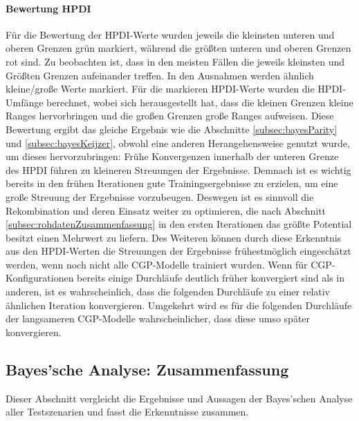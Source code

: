\paragraph{Bewertung HPDI}
Für die Bewertung der HPDI-Werte wurden jeweils die kleinsten unteren und oberen Grenzen grün markiert, während die größten unteren und oberen Grenzen rot sind.
Zu beobachten ist, dass in den meisten Fällen die jeweils kleinsten und Größten Grenzen aufeinander treffen.
In den Ausnahmen werden ähnlich kleine/große Werte markiert.
Für die markieren HPDI-Werte wurden die HPDI-Umfänge berechnet, wobei sich herausgestellt hat, dass die kleinen Grenzen kleine Ranges hervorbringen und die großen Grenzen große Ranges aufweisen.
Diese Bewertung ergibt das gleiche Ergebnis wie die Abschnitte \ref{subsec:bayesParity} und \ref{subsec:bayesKeijzer}, obwohl eine anderen Herangehensweise genutzt wurde, um dieses hervorzubringen:
Frühe Konvergenzen innerhalb der unteren Grenze des HPDI führen zu kleineren Streuungen der Ergebnisse.
Demnach ist es wichtig bereits in den frühen Iterationen gute Trainingsergebnisse zu erzielen, um eine große Streuung der Ergebnisse vorzubeugen.
Deswegen ist es sinnvoll die Rekombination und deren Einsatz weiter zu optimieren, die nach Abschnitt \ref{subsec:rohdatenZusammenfassung} in den ersten Iterationen das größte Potential besitzt einen Mehrwert zu liefern.
Des Weiteren können durch diese Erkenntnis aus den HPDI-Werten die Streuungen der Ergebnisse frühestmöglich eingeschätzt werden, wenn noch nicht alle CGP-Modelle trainiert wurden.
Wenn für CGP-Konfigurationen bereits einige Durchläufe deutlich früher konvergiert sind als in anderen, ist es wahrscheinlich, dass die folgenden Durchläufe zu einer relativ ähnlichen Iteration konvergieren.
Umgekehrt wird es für die folgenden Durchläufe der langsameren CGP-Modelle wahrscheinlicher, dass diese umso später konvergieren.


\subsection{Bayes'sche Analyse: Zusammenfassung}
\label{subsec:bayesZusammenfassung}

Dieser Abschnitt vergleicht die Ergebnisse und Aussagen der Bayes'schen Analyse aller Testszenarien und fasst die Erkenntnisse zusammen.

